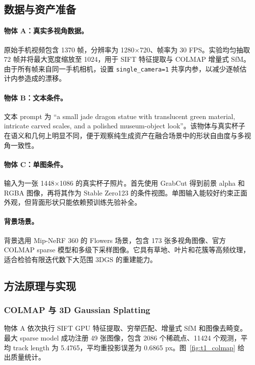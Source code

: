 \documentclass[11pt,UTF8,fontset=fandol]{ctexart}
\begin{document}
\subsection{数据与资产准备}
\paragraph{物体 A：真实多视角数据。}
原始手机视频包含 1370 帧，分辨率为 1280$\times$720、帧率为 30 FPS。实验均匀抽取 72 帧并将最大宽度缩放至 1024，用于 SIFT 特征提取与 COLMAP 增量式 SfM。由于所有帧来自同一手机相机，设置 \texttt{single\_camera=1} 共享内参，以减少逐帧估计内参造成的漂移。

\paragraph{物体 B：文本条件。}
文本 prompt 为 ``a small jade dragon statue with translucent green material, intricate carved scales, and a polished museum-object look''。该物体与真实杯子在语义和几何上明显不同，便于观察纯生成资产在融合场景中的形状自由度与多视角一致性。

\paragraph{物体 C：单图条件。}
输入为一张 1448$\times$1086 的真实杯子照片。首先使用 GrabCut 得到前景 alpha 和 RGBA 图像，再将其作为 Stable Zero123 的条件视图。单图输入能较好约束正面外观，但背面形状只能依赖预训练先验补全。

\paragraph{背景场景。}
背景选用 Mip-NeRF 360 的 Flowers 场景，包含 173 张多视角图像、官方 COLMAP sparse 模型和多级下采样图像。它具有草地、叶片和花簇等高频纹理，适合检验有限迭代数下大范围 3DGS 的重建能力。

\subsection{方法原理与实现}
\subsubsection{COLMAP 与 3D Gaussian Splatting}
物体 A 依次执行 SIFT GPU 特征提取、穷举匹配、增量式 SfM 和图像去畸变。最大 sparse model 成功注册 49 张图像，包含 2086 个稀疏点、11424 个观测，平均 track length 为 5.4765，平均重投影误差为 0.6865 px。图~\ref{fig:t1_colmap} 给出质量统计。
\end{document}
